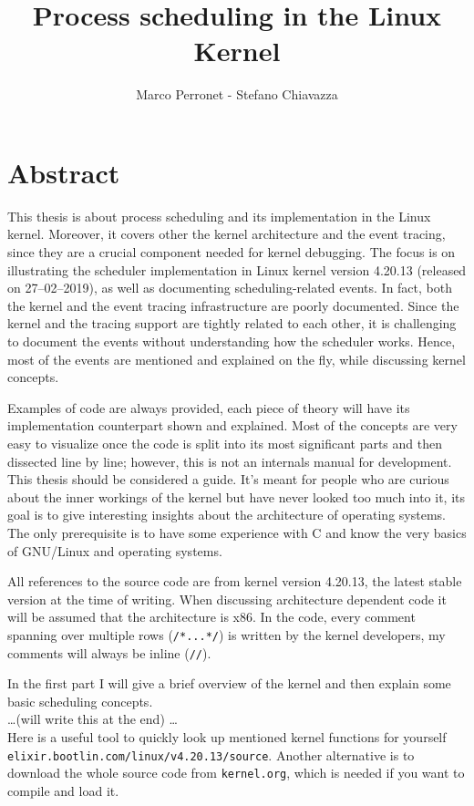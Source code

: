 \documentclass[10pt]{book}
\author{Marco Perronet - Stefano Chiavazza}
\title{Process scheduling in the Linux Kernel}
\begin{document}
\frontmatter

\begin{titlepage}
\maketitle  
\end{titlepage}

\tableofcontents

\chapter{Abstract}
This thesis is about process scheduling and its implementation in the Linux kernel. Moreover, it covers other the kernel architecture and the event tracing, since they are a crucial component needed for kernel debugging. %
The focus is on illustrating the scheduler implementation in Linux kernel version 4.20.13 (released on 27--02--2019), as well as documenting scheduling-related events. In fact, both the kernel and the event tracing infrastructure are poorly documented.
Since the kernel and the tracing support are tightly related to each other, it is challenging to document the events without understanding how the scheduler works. Hence, most of the events are mentioned and explained on the fly, while discussing kernel concepts.

Examples of code are always provided, each piece of theory will have its implementation counterpart shown and explained.
Most of the concepts are very easy to visualize once the code is split into its most significant parts
and then dissected line by line; however, this is not an internals manual for development. 
This thesis should be considered a guide. It's meant for people who are curious about the inner workings of the kernel
but have never looked too much into it, its goal is to give interesting insights about the architecture of operating systems.
The only prerequisite is to have some experience with C and know the very basics of GNU/Linux and operating systems.

All references to the source code are from kernel version 4.20.13, the latest stable version at the time of writing. When discussing architecture dependent code it will be assumed that the architecture is x86. In the code, every comment spanning over multiple rows (\verb|/*...*/|) is written by the kernel developers, my comments will always be inline (\verb|//|).

In the first part I will give a brief overview of the kernel and then explain some basic scheduling concepts.\\
\dots (will write this at the end)
\dots\\
Here is a useful tool to quickly look up mentioned kernel functions for yourself \texttt{elixir.bootlin.com/linux/v4.20.13/source}. Another alternative is to download the whole source code from \texttt{kernel.org}, which is needed if you want to compile and load it. 
\end{document}
